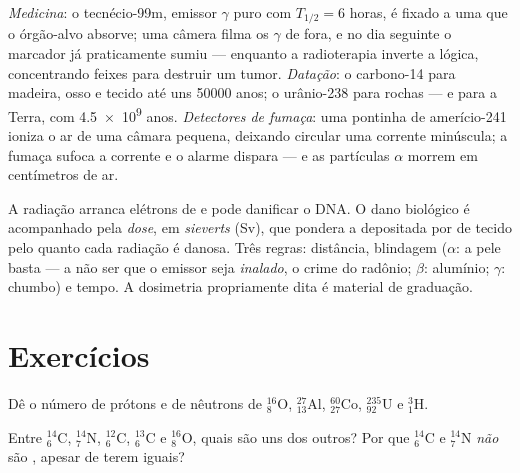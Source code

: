 \begin{example}\label{ex:g11:nucleus-radioactivity:uses}
\emph{Medicina}: o tecnécio-99m, emissor $\gamma$ puro com
$T_{1/2} = 6$ horas, é fixado a uma  que o órgão-alvo absorve;
uma câmera filma os $\gamma$ de fora, e no dia seguinte o marcador já
praticamente sumiu --- enquanto a radioterapia inverte a lógica,
concentrando feixes para destruir um tumor. \emph{Datação}: o carbono-14
para madeira, osso e tecido até uns \num{50000} anos; o urânio-238 para
rochas --- e para a Terra, com \num{4.5e9} anos. \emph{Detectores de
fumaça}: uma pontinha de amerício-241 ioniza o ar de uma câmara pequena,
deixando circular uma corrente minúscula; a fumaça sufoca a corrente e o
alarme dispara --- e as partículas $\alpha$ morrem em centímetros de ar.
\end{example}

\begin{remark}\label{rem:g11:nucleus-radioactivity:dose}
A radiação arranca elétrons de  e pode danificar o DNA. O dano
biológico é acompanhado pela \emph{dose}, em
\emph{sieverts} (\unit{Sv}), que pondera a 
depositada por  de tecido pelo quanto cada radiação é danosa.
Três regras: distância, blindagem ($\alpha$: a pele basta --- a não ser
que o emissor seja \emph{inalado}, o crime do radônio; $\beta$: alumínio;
$\gamma$: chumbo) e tempo. A dosimetria propriamente dita é material de
graduação.
\end{remark}

\section{Exercícios}

\begin{exercise}[$\star$]\label{exo:g11:nucleus-radioactivity:1}
Dê o número de prótons e de nêutrons de ${}^{16}_{8}\mathrm{O}$,
${}^{27}_{13}\mathrm{Al}$, ${}^{60}_{27}\mathrm{Co}$,
${}^{235}_{92}\mathrm{U}$ e ${}^{3}_{1}\mathrm{H}$.
\end{exercise}

\begin{exercise}[$\star$]\label{exo:g11:nucleus-radioactivity:2}
Entre ${}^{14}_{6}\mathrm{C}$, ${}^{14}_{7}\mathrm{N}$,
${}^{12}_{6}\mathrm{C}$, ${}^{13}_{6}\mathrm{C}$ e
${}^{16}_{8}\mathrm{O}$, quais são  uns dos outros? Por que
${}^{14}_{6}\mathrm{C}$ e ${}^{14}_{7}\mathrm{N}$ \emph{não} são
, apesar de terem  iguais?
\end{exercise}


